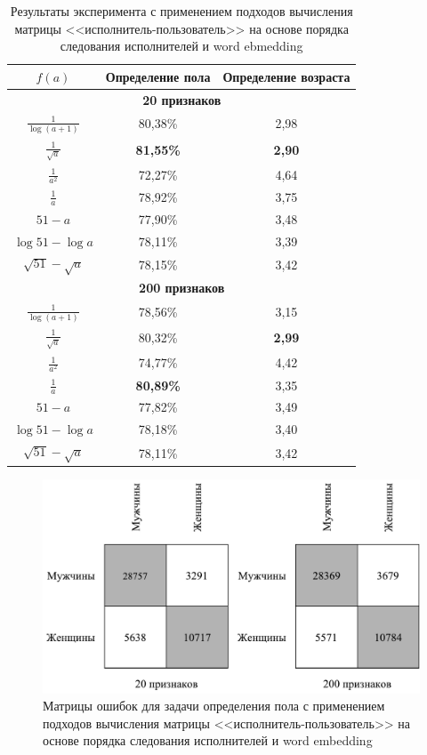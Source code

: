 \begin{table}[!h]
    \caption{Результаты эксперимента с применением подходов
             вычисления матрицы <<исполнитель-пользователь>>
             на основе порядка следования исполнителей 
             и word ebmedding}
    \label{tab:order_we}
\centering
\begin{tabular}{|c|c|c|}\hline
    \boldmath$f(a)$ & \textbf{Определение пола} & \textbf{Определение возраста} \\\hline
    \multicolumn{3}{|c|}{\textbf{20 признаков}} \\\hline
    $\frac{1}{\log(a + 1)}$ & 80,38\% & 2,98 \\\hline
    $\frac{1}{\sqrt{a}}$ & \textbf{81,55\%} & \textbf{2,90} \\\hline
    $\frac{1}{a^2}$ & 72,27\% & 4,64 \\\hline
    $\frac{1}{a}$ & 78,92\% & 3,75 \\\hline
    $51 - a$ & 77,90\% & 3,48 \\\hline
    $\log{51} - \log{a}$ & 78,11\% & 3,39 \\\hline
    $\sqrt{51} - \sqrt{a}$ & 78,15\% & 3,42 \\\hline
    \multicolumn{3}{|c|}{\textbf{200 признаков}} \\\hline
    $\frac{1}{\log(a + 1)}$ & 78,56\% & 3,15 \\\hline
    $\frac{1}{\sqrt{a}}$ & 80,32\% & \textbf{2,99} \\\hline
    $\frac{1}{a^2}$ & 74,77\% & 4,42 \\\hline
    $\frac{1}{a}$ & \textbf{80,89\%} & 3,35 \\\hline
    $51 - a$ & 77,82\% & 3,49 \\\hline
    $\log{51} - \log{a}$ & 78,18\% & 3,40 \\\hline
    $\sqrt{51} - \sqrt{a}$ & 78,11\% & 3,42 \\\hline
\end{tabular}
\end{table}

\begin{figure}[!h]
\caption{Матрицы ошибок для задачи определения пола с
         применением подходов вычисления матрицы 
         <<исполнитель-пользователь>> на основе порядка следования
         исполнителей и word embedding}
\label{fig:order_we_conf}
\centering
\includegraphics[scale=0.8]{figs/order-we-confusion.pdf}
\end{figure}

